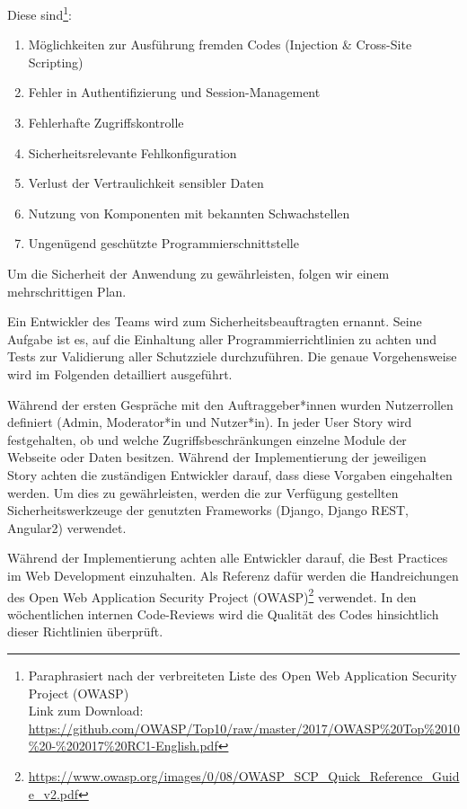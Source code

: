 \documentclass[accentcolor=tud0b,12pt,paper=a4]{tudreport}
\begin{document}
Diese sind\footnote{Paraphrasiert nach der verbreiteten Liste des Open Web Application Security Project (OWASP) \\
	Link zum Download:  \href{https://github.com/OWASP/Top10/raw/master/2017/OWASP\%20Top\%2010\%20-\%202017\%20RC1-English.pdf}{https://github.com/OWASP/Top10/raw/master/2017/OWASP\%20Top\%2010\%20-\%202017\%20RC1-English.pdf}}:
\begin{enumerate}
\item Möglichkeiten zur Ausführung fremden Codes (Injection \& Cross-Site Scripting)
\item Fehler in Authentifizierung und Session-Management
\item Fehlerhafte Zugriffskontrolle
\item Sicherheitsrelevante Fehlkonfiguration
\item Verlust der Vertraulichkeit sensibler Daten
\item Nutzung von Komponenten mit bekannten Schwachstellen
\item Ungenügend geschützte Programmierschnittstelle
\end{enumerate}

Um die Sicherheit der Anwendung zu gewährleisten, folgen wir einem mehrschrittigen Plan. 

Ein Entwickler des Teams wird zum Sicherheitsbeauftragten ernannt. Seine Aufgabe ist es, auf die Einhaltung aller Programmierrichtlinien zu achten und Tests zur Validierung aller Schutzziele durchzuführen. Die genaue Vorgehensweise wird im Folgenden detailliert ausgeführt.

Während der ersten Gespräche mit den Auftraggeber*innen wurden Nutzerrollen definiert (Admin, Moderator*in und Nutzer*in). In jeder User Story wird festgehalten, ob und welche Zugriffsbeschränkungen einzelne Module der Webseite oder Daten besitzen. Während der Implementierung der jeweiligen Story achten die zuständigen Entwickler darauf, dass diese Vorgaben eingehalten werden. Um dies zu gewährleisten, werden die zur Verfügung gestellten Sicherheitswerkzeuge der genutzten Frameworks (Django, Django REST, Angular2) verwendet.

Während der Implementierung achten alle Entwickler darauf, die Best Practices im Web Development einzuhalten. Als Referenz dafür werden die Handreichungen des Open Web Application Security Project (OWASP)\footnote{\href{https://www.owasp.org/images/0/08/OWASP_SCP_Quick_Reference_Guide_v2.pdf}{https://www.owasp.org/images/0/08/OWASP\_SCP\_Quick\_Reference\_Guide\_v2.pdf}} verwendet. In den wöchentlichen internen Code-Reviews wird die Qualität des Codes hinsichtlich dieser Richtlinien überprüft.
\end{document}
